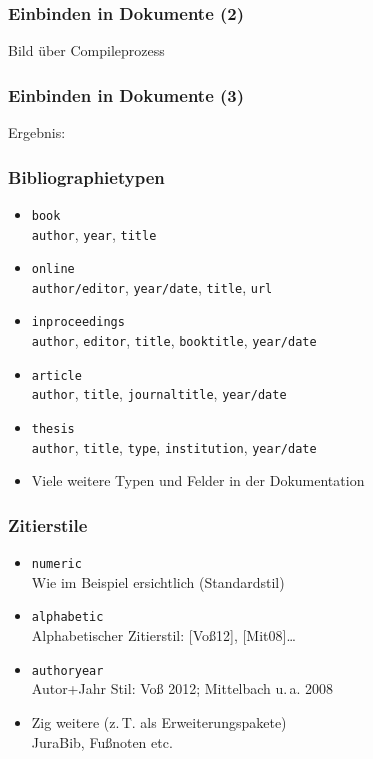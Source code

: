 \begin{frame}
  \frametitle{Einbinden in Dokumente}
  TeX}]{examples/bibliography/basic.tex}
\end{frame}

\begin{frame}
  \frametitle{Einbinden in Dokumente (2)}
  Bild über Compileprozess
\end{frame}

\begin{frame}
  \frametitle{Einbinden in Dokumente (3)}
  Ergebnis:
\end{frame}

\begin{frame}
  \frametitle{Bibliographietypen}
  \begin{itemize}
  \item \texttt{book}\\
    \texttt{author}, \texttt{year}, \texttt{title}
  \item \texttt{online}\\
    \texttt{author/editor}, \texttt{year/date}, \texttt{title},
    \texttt{url}
  \item \texttt{inproceedings}\\
    \texttt{author}, \texttt{editor}, \texttt{title},
    \texttt{booktitle}, \texttt{year/date}
  \item \texttt{article}\\
    \texttt{author}, \texttt{title}, \texttt{journaltitle},
    \texttt{year/date}
  \item \texttt{thesis}\\
    \texttt{author}, \texttt{title}, \texttt{type},
    \texttt{institution}, \texttt{year/date}
  \item Viele weitere Typen und Felder in der Dokumentation
  \end{itemize}
\end{frame}

\begin{frame}
  \frametitle{Zitierstile}
  \begin{itemize}
  \item \texttt{numeric}\\
    Wie im Beispiel ersichtlich (Standardstil)
  \item \texttt{alphabetic}\\
    Alphabetischer Zitierstil: [Voß12], [Mit08]\dots
  \item \texttt{authoryear}\\
    Autor+Jahr Stil: Voß 2012; Mittelbach u.\,a. 2008
  \item Zig weitere (z.\,T. als Erweiterungspakete)\\
    JuraBib, Fußnoten etc.
  \end{itemize}
\end{frame}

